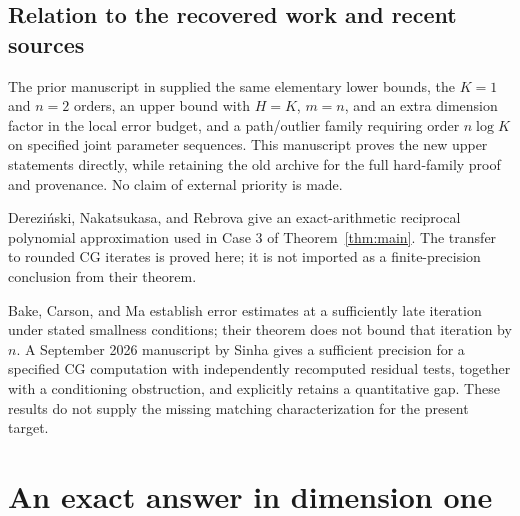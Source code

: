 \documentclass[11pt]{article}
\theoremstyle{remark}\newtheorem{remark}[theorem]{Remark}
\begin{document}
\subsection{Relation to the recovered work and recent sources}

The prior manuscript in  supplied the
same elementary lower bounds, the $K=1$ and $n=2$ orders, an upper bound
with $H=K$, $m=n$, and an extra dimension factor in the local error budget, and a path/outlier family requiring order $n\log K$
on specified joint parameter sequences. This manuscript proves the new
upper statements directly, while retaining the old archive for the full
hard-family proof and provenance. No claim of external priority is made.

Derezi\'nski, Nakatsukasa, and Rebrova give an exact-arithmetic reciprocal
polynomial approximation used in Case 3 of Theorem~\ref{thm:main}\cite{minberr}.
The transfer to rounded CG iterates is proved here; it is not imported
as a finite-precision conclusion from their theorem.

Bake, Carson, and Ma establish error estimates at a sufficiently late
iteration under stated smallness conditions; their theorem does not bound
that iteration by $n$\cite{bcm}. A September 2026 manuscript by Sinha gives
a sufficient precision for a specified CG computation with independently
recomputed residual tests, together with a conditioning obstruction,
and explicitly retains a quantitative gap\cite{sinha}. These results do
not supply the missing matching characterization for the present target.

\section{An exact answer in dimension one}
\label{sec:scalar}
\end{document}

